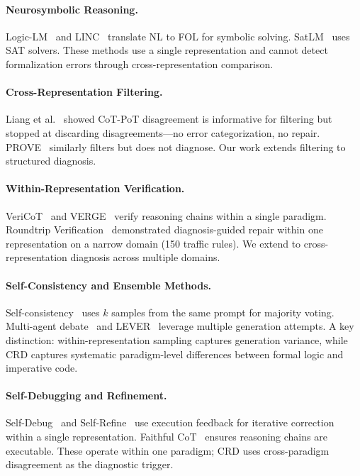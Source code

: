 \documentclass[11pt,a4paper]{article}
\begin{document}
\paragraph{Neurosymbolic Reasoning.}
Logic-LM~\cite{pan2023logiclm} and LINC~\cite{olausson2023linc} translate NL to FOL for symbolic solving. SatLM~\cite{ye2024satlm} uses SAT solvers. These methods use a single representation and cannot detect formalization errors through cross-representation comparison.

\paragraph{Cross-Representation Filtering.}
Liang et al.~\cite{liang2024cotpot} showed CoT-PoT disagreement is informative for filtering but stopped at discarding disagreements---no error categorization, no repair. PROVE~\cite{prove2024} similarly filters but does not diagnose. Our work extends filtering to structured diagnosis.

\paragraph{Within-Representation Verification.}
VeriCoT~\cite{weng2023vericot} and VERGE~\cite{kang2025verge} verify reasoning chains within a single paradigm. Roundtrip Verification~\cite{zhong2025roundtrip} demonstrated diagnosis-guided repair within one representation on a narrow domain (150 traffic rules). We extend to cross-representation diagnosis across multiple domains.

\paragraph{Self-Consistency and Ensemble Methods.}
Self-consistency~\cite{wang2023selfconsistency} uses $k$ samples from the same prompt for majority voting. Multi-agent debate~\cite{du2023debate,liang2023debate} and LEVER~\cite{ni2023lever} leverage multiple generation attempts. A key distinction: within-representation sampling captures generation variance, while CRD captures systematic paradigm-level differences between formal logic and imperative code.

\paragraph{Self-Debugging and Refinement.}
Self-Debug~\cite{chen2023selfdebug} and Self-Refine~\cite{madaan2023selfrefine} use execution feedback for iterative correction within a single representation. Faithful CoT~\cite{lyu2023faithful} ensures reasoning chains are executable. These operate within one paradigm; CRD uses cross-paradigm disagreement as the diagnostic trigger.
\end{document}
